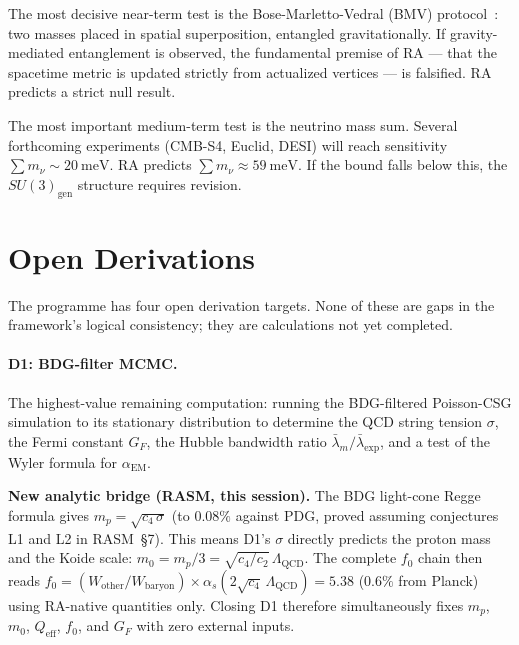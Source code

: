 \documentclass[11pt,a4paper]{article}
\begin{document}
The most decisive near-term test is the Bose-Marletto-Vedral
(BMV) protocol~\citep{Bose2017, Marletto2017}: two masses placed in
spatial superposition, entangled gravitationally. If gravity-mediated
entanglement is observed, the fundamental premise of RA --- that the
spacetime metric is updated strictly from actualized vertices --- is
falsified. RA predicts a strict null result.

The most important medium-term test is the neutrino mass sum.
Several forthcoming experiments (CMB-S4, Euclid, DESI) will reach
sensitivity $\sum m_\nu \sim 20~\mathrm{meV}$. RA predicts
$\sum m_\nu \approx 59~\mathrm{meV}$. If the bound falls below
this, the $SU(3)_{\mathrm{gen}}$ structure requires revision.

\section{Open Derivations}
\label{sec:open}

The programme has four open derivation targets. None of these are gaps
in the framework's logical consistency; they are calculations not yet
completed.

\paragraph{D1: BDG-filter MCMC.}
The highest-value remaining computation: running the BDG-filtered
Poisson-CSG simulation to its stationary distribution to determine the
QCD string tension $\sigma$, the Fermi constant $G_F$, the Hubble
bandwidth ratio $\bar\lambda_m/\bar\lambda_{\mathrm{exp}}$, and a test of the
Wyler formula for $\alpha_{\mathrm{EM}}$.

\textbf{New analytic bridge (RASM, this session).}
The BDG light-cone Regge formula gives $m_p = \sqrt{c_4\,\sigma}$ (to $0.08\%$
against PDG, proved assuming conjectures L1 and L2 in RASM~\S7).
This means D1's $\sigma$ directly predicts the proton mass and the Koide
scale: $m_0 = m_p/3 = \sqrt{c_4/c_2}\,\Lambda_{\mathrm{QCD}}$.  The complete
$f_0$ chain then reads
$f_0 = (W_{\mathrm{other}}/W_{\mathrm{baryon}})\times\alpha_s(2\sqrt{c_4}\,\Lambda_{\mathrm{QCD}}) = 5.38$
($0.6\%$ from Planck) using RA-native quantities only.  Closing D1 therefore
simultaneously fixes $m_p$, $m_0$, $Q_{\mathrm{eff}}$, $f_0$, and $G_F$
with zero external inputs.
\end{document}
